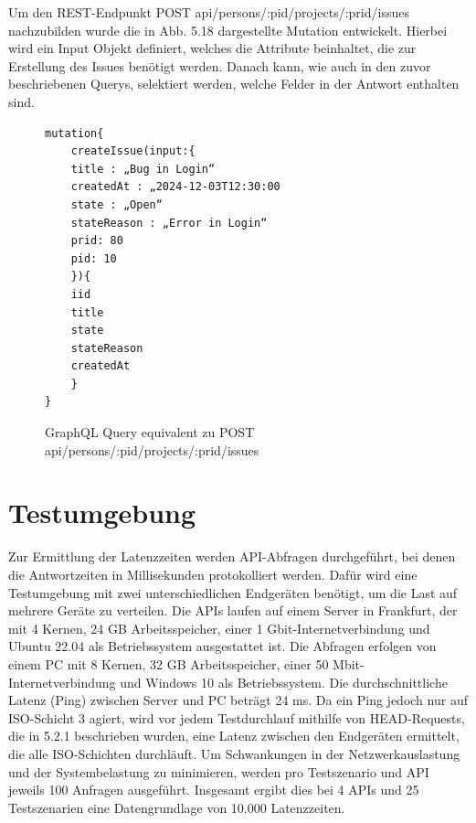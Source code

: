 \noindent
Um den REST-Endpunkt \colorbox{gray!20}{POST api/persons/:pid/projects/:prid/issues} nachzubilden wurde die in Abb. 5.18 dargestellte Mutation entwickelt. Hierbei wird ein Input Objekt definiert, welches die Attribute beinhaltet, die zur Erstellung des Issues benötigt werden. Danach kann, wie auch in den zuvor beschriebenen Querys, selektiert werden, welche Felder in der Antwort enthalten sind.
\begin{figure}[H]
\begin{center}
\begin{BVerbatim}
mutation{
    createIssue(input:{
	title : „Bug in Login“
	createdAt : „2024-12-03T12:30:00
	state : „Open“
	stateReason : „Error in Login“
	prid: 80
	pid: 10
	}){
	iid
	title
	state
	stateReason
	createdAt
    }
}
\end{BVerbatim}
\end{center}
\caption{GraphQL Query equivalent zu POST api/persons/:pid/projects/:prid/issues}
\end{figure}

\label{sec:graphql}

\section{Testumgebung} %
\label{sec:testumgebung}
Zur Ermittlung der Latenzzeiten werden API-Abfragen durchgeführt, bei denen die Antwortzeiten in Millisekunden protokolliert werden. Dafür wird eine Testumgebung mit zwei unterschiedlichen Endgeräten benötigt, um die Last auf mehrere Geräte zu verteilen. Die APIs laufen auf einem Server in Frankfurt, der mit 4 Kernen, 24 GB Arbeitsspeicher, einer 1 Gbit-Internetverbindung und Ubuntu 22.04 als Betriebssystem ausgestattet ist.
\newline
Die Abfragen erfolgen von einem PC mit 8 Kernen, 32 GB Arbeitsspeicher, einer 50 Mbit-Internetverbindung und Windows 10 als Betriebssystem. Die durchschnittliche Latenz (Ping) zwischen Server und PC beträgt 24 ms. Da ein Ping jedoch nur auf ISO-Schicht 3 agiert, wird vor jedem Testdurchlauf mithilfe von HEAD-Requests, die in 5.2.1 beschrieben wurden, eine Latenz zwischen den Endgeräten ermittelt, die alle ISO-Schichten durchläuft. Um Schwankungen in der Netzwerkauslastung und der Systembelastung zu minimieren, werden pro Testszenario und API jeweils 100 Anfragen ausgeführt. Insgesamt ergibt dies bei 4 APIs und 25 Testszenarien eine Datengrundlage von 10.000 Latenzzeiten.




